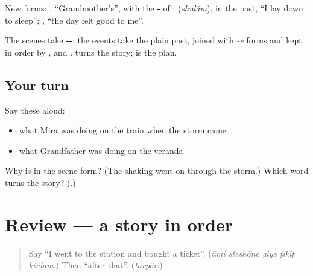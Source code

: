 \begin{culture}
New forms: \textbf{}, \textquotedblleft{}Grandmother's\textquotedblright{}, with the \textbf{-} of \textbf{}; \textbf{} (\emph{shulām}), \textbf{} in the past, \textquotedblleft{}I lay down to sleep\textquotedblright{}; \textbf{   }, \textquotedblleft{}the day felt good to me\textquotedblright{}.

The scenes take \textbf{--}; the events take the plain past, joined with \emph{-e} forms and kept in order by \textbf{}, \textbf{} and \textbf{}. \textbf{} turns the story; \textbf{} is the plan.
\end{culture}

\subsection*{Your turn}
Say these aloud:

\begin{itemize}
\raggedright
  \item what Mira was doing on the train when the storm came
  \item what Grandfather was doing on the veranda
\end{itemize}

\begin{tcolorbox}[breakable,colback=teal!4,colframe=teal!35!black,title={Before you move on}]
Why is \textbf{} in the scene form? (The shaking went on through the storm.) Which word turns the story? (\textbf{}.)
\end{tcolorbox}
\section[(review)]{Review — a story in order}

\label{lesson:BN-R267-a-story-in-order}



\begin{quote}
Say \textquotedblleft{}I went to the station and bought a ticket\textquotedblright{}. (\emph{āmi sṭeshône giye ṭikiṭ kinlām}.) Then \textquotedblleft{}after that\textquotedblright{}. (\emph{tārpôr}.)
\end{quote}

